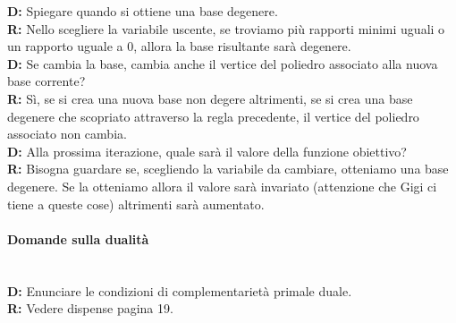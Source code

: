 \documentclass[10pt,                    %
               a4paper,                 %
               twoside,                 %
               openright,               %
               english,                 
               italian,                 
]{article}
\begin{document}
\textbf{D:} Spiegare quando si ottiene una base degenere. \\
\textbf{R:} Nello scegliere la variabile uscente, se troviamo più rapporti minimi uguali o un rapporto uguale a 0, allora la base risultante sarà degenere. \\

\textbf{D:} Se cambia la base, cambia anche il vertice del poliedro associato alla nuova base corrente? \\
\textbf{R:} Sì, se si crea una nuova base non degere altrimenti, se si crea una base degenere che scopriato attraverso la regla precedente, il vertice del poliedro associato non cambia. \\

\textbf{D:} Alla prossima iterazione, quale sarà il valore della funzione obiettivo? \\
\textbf{R:} Bisogna guardare se, scegliendo la variabile da cambiare, otteniamo una base degenere. Se la otteniamo allora il valore sarà invariato (attenzione che Gigi ci tiene a queste cose) altrimenti sarà aumentato. \\


\paragraph{Domande sulla dualità} \mbox{} \\
\textbf{D:} Enunciare le condizioni di complementarietà primale duale. \\
\textbf{R:} Vedere dispense pagina 19.  \\ 
\end{document}
